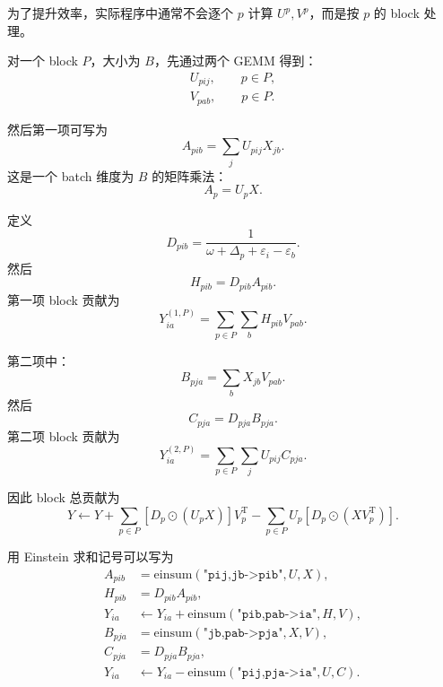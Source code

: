 \documentclass[UTF8,a4paper,11pt]{ctexart}
\newcommand{\eps}{\varepsilon}
\newcommand{\Had}{\odot}
\newcommand{\trans}{\mathrm{T}}
\begin{document}
为了提升效率，实际程序中通常不会逐个 $p$ 计算 $U^p,V^p$，而是按 $p$ 的 block 处理。

对一个 block $P$，大小为 $B$，先通过两个 GEMM 得到：
\begin{align}
U_{pij}, \qquad p\in P,
\\
V_{pab}, \qquad p\in P.
\end{align}

然后第一项可写为
\begin{equation}
A_{pib}
=
\sum_j U_{pij}X_{jb}.
\label{eq:batched_A}
\end{equation}
这是一个 batch 维度为 $B$ 的矩阵乘法：
\begin{equation}
A_p=U_pX.
\end{equation}

定义
\begin{equation}
D_{pib}
=
\frac{1}{\omega+\Delta_p+\eps_i-\eps_b}.
\label{eq:batched_D}
\end{equation}
然后
\begin{equation}
H_{pib}=D_{pib}A_{pib}.
\end{equation}
第一项 block 贡献为
\begin{equation}
Y^{(1,P)}_{ia}
=
\sum_{p\in P}\sum_b H_{pib}V_{pab}.
\label{eq:batched_Y1}
\end{equation}

第二项中：
\begin{equation}
B_{pja}
=
\sum_b X_{jb}V_{pab}.
\label{eq:batched_B}
\end{equation}
然后
\begin{equation}
C_{pja}=D_{pja}B_{pja}.
\end{equation}
第二项 block 贡献为
\begin{equation}
Y^{(2,P)}_{ia}
=
\sum_{p\in P}\sum_j U_{pij}C_{pja}.
\label{eq:batched_Y2}
\end{equation}

因此 block 总贡献为
\begin{equation}
Y
\gets
Y
+
\sum_{p\in P}
\left[
D_p\Had (U_pX)
\right]V_p^{\trans}
-
\sum_{p\in P}
U_p
\left[
D_p\Had (XV_p^{\trans})
\right].
\label{eq:block_update}
\end{equation}

用 Einstein 求和记号可以写为
\begin{align}
A_{pib} &= \mathrm{einsum}(\texttt{"pij,jb->pib"}, U, X),
\\
H_{pib} &= D_{pib}A_{pib},
\\
Y_{ia} &\gets Y_{ia}
+
\mathrm{einsum}(\texttt{"pib,pab->ia"}, H, V),
\\
B_{pja} &= \mathrm{einsum}(\texttt{"jb,pab->pja"}, X,V),
\\
C_{pja} &= D_{pja}B_{pja},
\\
Y_{ia} &\gets Y_{ia}
-
\mathrm{einsum}(\texttt{"pij,pja->ia"}, U,C).
\end{align}
\end{document}
